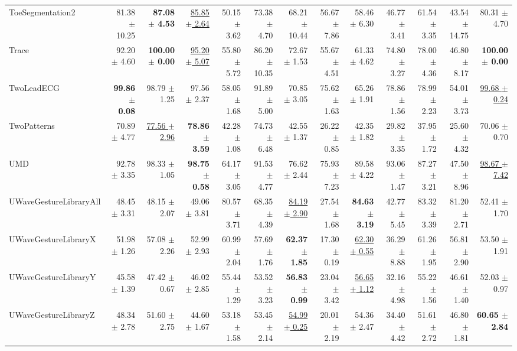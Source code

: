 \begin{landscape}
\begin{longtable}{lrrrrrrrrrrrr}
ToeSegmentation2 & 81.38 $\pm$ 10.25 & \textbf{87.08 $\pm$ 4.53} & \underline{85.85 $\pm$ 2.64} & 50.15 $\pm$ 3.62 & 73.38 $\pm$ 4.70 & 68.21 $\pm$ 10.44 & 56.67 $\pm$ 7.86 & 58.46 $\pm$ 6.30 & 46.77 $\pm$ 3.41 & 61.54 $\pm$ 3.35 & 43.54 $\pm$ 14.75 & 80.31 $\pm$ 4.70 \\
Trace & 92.20 $\pm$ 4.60 & \textbf{100.00 $\pm$ 0.00} & \underline{95.20 $\pm$ 5.07} & 55.80 $\pm$ 5.72 & 86.20 $\pm$ 10.35 & 72.67 $\pm$ 1.53 & 55.67 $\pm$ 4.51 & 61.33 $\pm$ 4.62 & 74.80 $\pm$ 3.27 & 78.00 $\pm$ 4.36 & 46.80 $\pm$ 8.17 & \textbf{100.00 $\pm$ 0.00} \\
TwoLeadECG & \textbf{99.86 $\pm$ 0.08} & 98.79 $\pm$ 1.25 & 97.56 $\pm$ 2.37 & 58.05 $\pm$ 1.68 & 91.89 $\pm$ 5.00 & 70.85 $\pm$ 3.05 & 75.62 $\pm$ 1.63 & 65.26 $\pm$ 1.91 & 78.86 $\pm$ 1.56 & 78.99 $\pm$ 2.23 & 54.01 $\pm$ 3.73 & \underline{99.68 $\pm$ 0.24} \\
TwoPatterns & 70.89 $\pm$ 4.77 & \underline{77.56 $\pm$ 2.96} & \textbf{78.86 $\pm$ 3.59} & 42.28 $\pm$ 1.08 & 74.73 $\pm$ 6.48 & 42.55 $\pm$ 1.37 & 26.22 $\pm$ 0.85 & 42.35 $\pm$ 1.82 & 29.82 $\pm$ 3.35 & 37.95 $\pm$ 1.72 & 25.60 $\pm$ 4.32 & 70.06 $\pm$ 0.70 \\
UMD & 92.78 $\pm$ 3.35 & 98.33 $\pm$ 1.05 & \textbf{98.75 $\pm$ 0.58} & 64.17 $\pm$ 3.05 & 91.53 $\pm$ 4.77 & 76.62 $\pm$ 2.44 & 75.93 $\pm$ 7.23 & 89.58 $\pm$ 4.22 & 93.06 $\pm$ 1.47 & 87.27 $\pm$ 3.21 & 47.50 $\pm$ 8.96 & \underline{98.67 $\pm$ 7.42} \\
UWaveGestureLibraryAll & 48.45 $\pm$ 3.31 & 48.15 $\pm$ 2.07 & 49.06 $\pm$ 3.81 & 80.57 $\pm$ 3.71 & 68.35 $\pm$ 4.39 & \underline{84.19 $\pm$ 2.90} & 27.54 $\pm$ 1.68 & \textbf{84.63 $\pm$ 3.19} & 42.77 $\pm$ 5.45 & 83.32 $\pm$ 3.39 & 81.20 $\pm$ 2.71 & 52.41 $\pm$ 1.70 \\
UWaveGestureLibraryX & 51.98 $\pm$ 1.26 & 57.08 $\pm$ 2.26 & 52.99 $\pm$ 2.93 & 60.99 $\pm$ 2.04 & 57.69 $\pm$ 1.76 & \textbf{62.37 $\pm$ 1.85} & 17.30 $\pm$ 0.19 & \underline{62.30 $\pm$ 0.55} & 36.29 $\pm$ 8.88 & 61.26 $\pm$ 1.95 & 56.81 $\pm$ 2.90 & 53.50 $\pm$ 1.91 \\
UWaveGestureLibraryY & 45.58 $\pm$ 1.39 & 47.42 $\pm$ 0.67 & 46.02 $\pm$ 2.85 & 55.44 $\pm$ 1.29 & 53.52 $\pm$ 3.23 & \textbf{56.83 $\pm$ 0.99} & 23.04 $\pm$ 3.42 & \underline{56.65 $\pm$ 1.12} & 32.16 $\pm$ 4.98 & 55.22 $\pm$ 1.56 & 46.61 $\pm$ 1.40 & 52.03 $\pm$ 0.97 \\
UWaveGestureLibraryZ & 48.34 $\pm$ 2.78 & 51.60 $\pm$ 2.75 & 44.60 $\pm$ 1.67 & 53.18 $\pm$ 1.58 & 53.45 $\pm$ 2.14 & \underline{54.99 $\pm$ 0.25} & 20.01 $\pm$ 2.19 & 54.36 $\pm$ 2.47 & 34.40 $\pm$ 4.42 & 51.61 $\pm$ 2.72 & 46.80 $\pm$ 1.81 & \textbf{60.65 $\pm$ 2.84} \\

\end{longtable}
\end{landscape}

